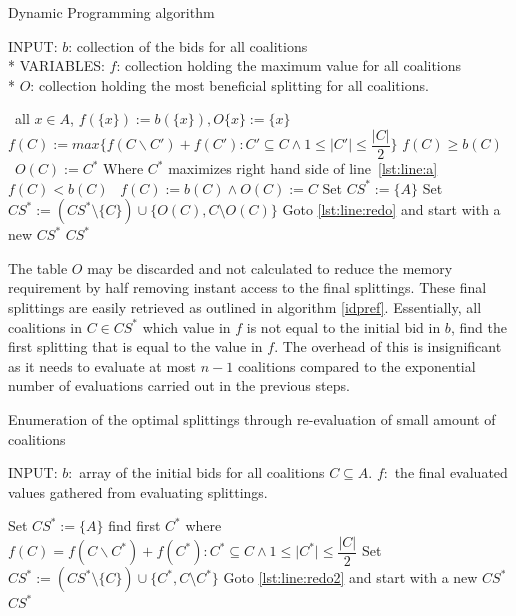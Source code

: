 \documentclass{llncs}
\begin{document}
\begin{algorithm}
\caption{Dynamic Programming algorithm \label{DP}}
INPUT: $b$: collection of the bids for all coalitions\\*
VARIABLES: $f$: collection holding the maximum value for all coalitions\\*
$O$: collection holding the most beneficial splitting for all coalitions.
\begin{algorithmic}[1]
\STATE\algorithmicfor\ all $x \in A$, \algorithmicdo  $f(\{x\}):= b(\{x\}),O\{x\}:= \{x\}$ \algorithmicendfor
{}
\STATE $f(C) := max\{f(C\backslash C')+f(C'):C'\subseteq C \wedge 1 \leq \vert C' \vert \leq \dfrac{\vert C \vert}{2}\}$ \label{lst:line:a}
\STATE\algorithmicif $f(C) \geq b(C)$ \algorithmicthen\ $O(C) := C^{*}$ \hfill Where $C^{*}$ maximizes right hand side of line~\ref{lst:line:a} \algorithmicendif
\STATE\algorithmicif $f(C) < b(C)$ \algorithmicthen\ $f(C) := b(C)\wedge O(C) := C$ \algorithmicendif
\ENDFOR
\ENDFOR
\STATE Set $CS^* := \{A\}$
 \label{lst:line:redo}
\STATE Set $CS^* := (CS^*\setminus \{C\})\cup \{O(C),C\setminus O(C)\}$ 
\STATE Goto \ref{lst:line:redo} and start with a new $CS^*$
\ENDIF
\ENDFOR
\RETURN $CS^*$
\end{algorithmic}
\end{algorithm}

The table $O$ may be discarded and not calculated to reduce the memory requirement by half removing instant access to the final splittings.
These final splittings are easily retrieved as outlined in algorithm \ref{idpref}. 
Essentially, all coalitions in $C \in CS^*$ which value in $f$
is not equal to the initial bid in $b$, find the first splitting that is equal to the value in $f$.
The overhead of this is insignificant as it needs to evaluate at most $n -1$ coalitions compared to the exponential
number of evaluations carried out in the previous steps\cite{eps265062}.

\begin{algorithm}
\caption{Enumeration of the optimal splittings through re-evaluation of small amount of coalitions \label{idpref}}
INPUT: $b:$ array of the initial bids for all coalitions $C \subseteq A$. 
$f:$ the final evaluated values gathered from evaluating splittings.
\begin{algorithmic}[1]
\STATE Set $CS^* := \{A\}$
 \label{lst:line:redo2}
\STATE find first $C^*$ where $f(C) = f(C\backslash C^*)+f(C^*):C^*\subseteq C \wedge 1 \leq \vert C^* \vert \leq \dfrac{\vert C \vert}{2}$ \label{lst:line:aa}
\STATE Set $CS^* := (CS^*\setminus \{C\})\cup \{C^*,C\setminus C^*\}$
\STATE Goto \ref{lst:line:redo2} and start with a new $CS^*$
\ENDIF
\ENDFOR
\RETURN $CS^*$
\end{algorithmic}
\end{algorithm}
\end{document}
